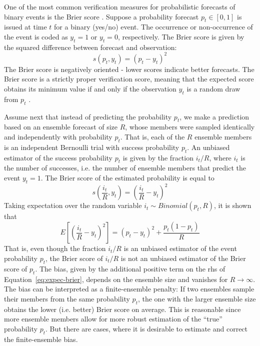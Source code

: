 \documentclass[article]{jss}
\begin{document}
One of the most common verification measures for probabilistic forecasts of binary events is the Brier score \citep{brier1950verification}.
Suppose a probability forecast $p_t \in [0,1]$ is issued at time $t$ for a binary (yes/no) event.
The occurrence or non-occurrence of the event is coded as $y_t=1$ or $y_t=0$, respectively. 
The Brier score is given by the squared difference between forecast and observation:
%
\begin{equation}
s(p_t, y_t) = (p_t - y_t)^2
\end{equation}
%
The Brier score is negatively oriented - lower scores indicate better forecasts.
The Brier score is a strictly proper verification score, meaning that the expected score obtains its minimum value if and only if the observation $y_t$ is a random draw from $p_t$ \citep{gneiting2007strictly}.


Assume next that instead of predicting the probability $p_t$, we make a prediction based on an ensemble forecast of size $R$, whose members were sampled identically and independently with probability $p_t$.
That is, each of the $R$ ensemble members is an independent Bernoulli trial with success probability $p_t$.
An unbiased estimator of the success probability $p_t$ is given by the fraction $i_t/R$, where $i_t$ is the number of successes, i.e. the number of ensemble members that predict the event $y_t=1$.
The Brier score of the estimated probability is equal to
%
\begin{equation}
s\left(\frac{i_t}{R}, y_t\right) = \left(\frac{i_t}{R} - y_t\right)^2
\label{eq:unfair-brier}
\end{equation}
%
Taking expectation over the random variable $i_t \sim Binomial(p_t, R)$, it is shown that \citep{ferro2008effect}
%
\begin{equation}
E\left[\left(\frac{i_t}{R} - y_t\right)^2\right] = (p_t - y_t)^2 +\frac{p_t(1-p_t)}{R}
\label{eq:expec-brier}
\end{equation}
%
That is, even though the fraction $i_t/R$ is an unbiased estimator of the event probability $p_t$, the Brier score of $i_t/R$ is not an unbiased estimator of the Brier score of $p_t$.
The bias, given by the additional positive term on the rhs of Equation~\ref{eq:expec-brier}, depends on the ensemble size and vanishes for $R\rightarrow\infty$.
The bias can be interpreted as a finite-ensemble penalty: If two ensembles sample their members from the same probability $p_t$, the one with the larger ensemble size obtains the lower (i.e. better) Brier score on average.
This is reasonable since more ensemble members allow for more robust estimation of the ``true'' probability $p_t$.
But there are cases, where it is desirable to estimate and correct the finite-ensemble bias.
\end{document}
